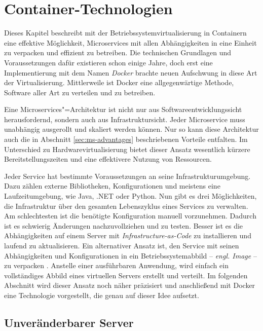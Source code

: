 \chapter{Container-Technologien}

Dieses Kapitel beschreibt mit der Betriebssystemvirtualisierung in Containern eine effektive Möglichkeit, Microservices mit allen Abhängigkeiten in eine Einheit zu verpacken und effizient zu betreiben. Die technischen Grundlagen und Voraussetzungen dafür existieren schon einige Jahre, doch erst eine Implementierung mit dem Namen \textit{Docker} brachte neuen Aufschwung in diese Art der Virtualisierung. Mittlerweile ist Docker eine allgegenwärtige Methode, Software aller Art zu verteilen und zu betreiben.

Eine Microservices"=Architektur ist nicht nur aus Softwareentwicklungssicht herausfordernd, sondern auch aus Infrastruktursicht. Jeder Microservice muss unabhängig ausgerollt und skaliert werden können. Nur so kann diese Architektur auch die in Abschnitt \ref{sec:ms-advantages} beschriebenen Vorteile entfalten. Im Unterschied zu Hardwarevirtualisierung bietet dieser Ansatz wesentlich kürzere Bereitstellungszeiten und eine effektivere Nutzung von Ressourcen.

Jeder Service hat bestimmte Voraussetzungen an seine Infrastrukturumgebung. Dazu zählen externe Bibliotheken, Konfigurationen und meistens eine Laufzeitumgebung, wie \zB Java, .NET oder Python. Nun gibt es drei Möglichkeiten, die Infrastruktur über den gesamten Lebenszyklus eines Services zu verwalten. Am schlechtesten ist die benötigte Konfiguration manuell vorzunehmen. Dadurch ist es schwierig Änderungen nachzuvollziehen und zu testen. Besser ist es die Abhängigkeiten auf einem Server mit \textit{Infrastructure-as-Code} zu installieren und laufend zu aktualisieren. Ein alternativer Ansatz ist, den Service mit seinen Abhängigkeiten und Konfigurationen in ein Betriebssystemabbild -- \textit{engl. Image} -- zu verpacken \cite[113]{newman2015building}. Anstelle einer ausführbaren Anwendung, wird einfach ein vollständiges Abbild eines virtuellen Servers erstellt und verteilt. Im folgenden Abschnitt wird dieser Ansatz noch näher präzisiert und anschließend mit Docker eine Technologie vorgestellt, die genau auf dieser Idee aufsetzt.
\section{Unveränderbarer Server}

